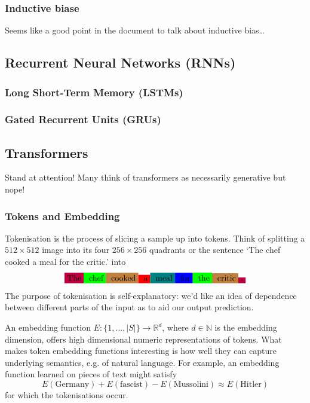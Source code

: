 \documentclass[11pt]{article}
\begin{document}
\subsubsection{Inductive biase}
Seems like a good point in the document to talk about inductive bias\dots

\subsection{\TODO{: }Recurrent Neural Networks (RNNs)}

\subsubsection{Long Short-Term Memory (LSTMs)}

\subsubsection{Gated Recurrent Units (GRUs)}

\subsection{\TODO{: }Transformers}
Stand at attention! Many think of transformers as necessarily generative but nope!

\subsubsection{Tokens and Embedding}
Tokenisation is the process of slicing a sample up into tokens. Think of splitting a $512\times512$ image into its four $256\times256$ quadrants or the sentence `The chef cooked a meal for the critic.' into
$$
\colorbox{purple}{The}\colorbox{green}{ chef}\colorbox{brown}{ cooked}\colorbox{red}{ a}\colorbox{teal}{ meal}\colorbox{blue}{ for}\colorbox{green}{ the}\colorbox{brown}{ critic}\colorbox{purple}{.}
$$
The purpose of tokenisation is self-explanatory: we'd like an idea of dependence between different parts of the input as to aid our output prediction.

An embedding function $E:\{1,\dots,|S|\}\to\mathbb{R}^d$, where $d\in\mathbb{N}$ is the embedding dimension, offers high dimensional numeric representations of tokens. What makes token embedding functions interesting is how well they can capture underlying semantics, e.g. of natural language. For example, an embedding function learned on pieces of text might satisfy
$$
E(\text{Germany})+E(\text{fascist})-E(\text{Mussolini})
\approx
E(\text{Hitler})
$$
for which the tokenisations occur.
\end{document}
